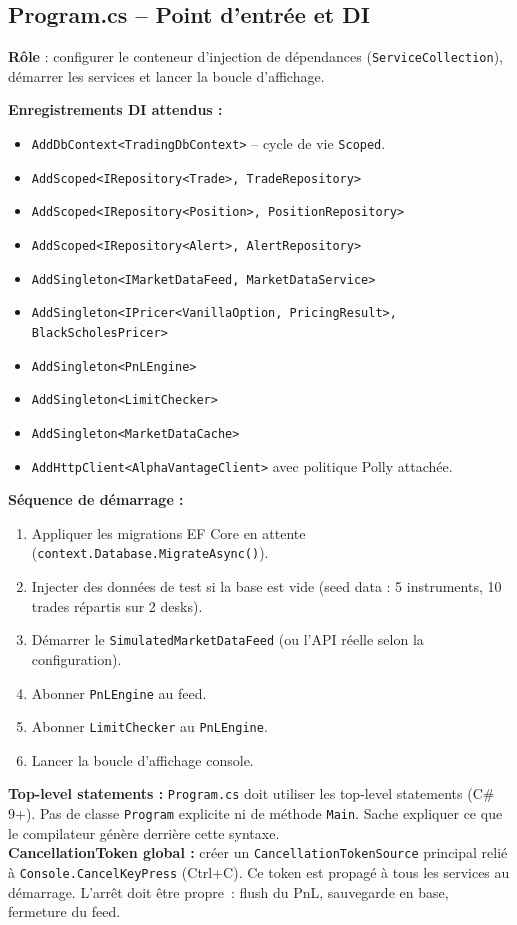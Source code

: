 \documentclass[a4paper,11pt]{article}
\newcommand{\cs}[1]{\texttt{\color{codeinline}#1}}
\begin{document}
\subsection{Program.cs -- Point d'entrée et DI}

\textbf{Rôle} : configurer le conteneur d'injection de dépendances
(\cs{ServiceCollection}), démarrer les services et lancer la boucle
d'affichage.

\textbf{Enregistrements DI attendus :}
\begin{itemize}
  \item \cs{AddDbContext<TradingDbContext>} -- cycle de vie \cs{Scoped}.
  \item \cs{AddScoped<IRepository<Trade>, TradeRepository>}
  \item \cs{AddScoped<IRepository<Position>, PositionRepository>}
  \item \cs{AddScoped<IRepository<Alert>, AlertRepository>}
  \item \cs{AddSingleton<IMarketDataFeed, MarketDataService>}
  \item \cs{AddSingleton<IPricer<VanillaOption, PricingResult>, BlackScholesPricer>}
  \item \cs{AddSingleton<PnLEngine>}
  \item \cs{AddSingleton<LimitChecker>}
  \item \cs{AddSingleton<MarketDataCache>}
  \item \cs{AddHttpClient<AlphaVantageClient>} avec politique Polly attachée.
\end{itemize}

\textbf{Séquence de démarrage :}
\begin{enumerate}
  \item Appliquer les migrations EF Core en attente (\cs{context.Database.MigrateAsync()}).
  \item Injecter des données de test si la base est vide (seed data :
        5 instruments, 10 trades répartis sur 2 desks).
  \item Démarrer le \cs{SimulatedMarketDataFeed} (ou l'API réelle selon
        la configuration).
  \item Abonner \cs{PnLEngine} au feed.
  \item Abonner \cs{LimitChecker} au \cs{PnLEngine}.
  \item Lancer la boucle d'affichage console.
\end{enumerate}

\begin{tcolorbox}[constraint]
\textbf{Top-level statements :} \cs{Program.cs} doit utiliser les top-level
statements (C\# 9+). Pas de classe \cs{Program} explicite ni de méthode
\cs{Main}. Sache expliquer ce que le compilateur génère derrière
cette syntaxe. \\[4pt]
\textbf{CancellationToken global :} créer un \cs{CancellationTokenSource}
principal relié à \cs{Console.CancelKeyPress} (Ctrl+C). Ce token est
propagé à tous les services au démarrage. L'arrêt doit être
propre~: flush du PnL, sauvegarde en base, fermeture du feed.
\end{tcolorbox}
\end{document}
